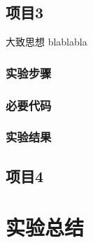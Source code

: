 \subsection{项目3}
大致思想 blablabla
\subsubsection{实验步骤}
\subsubsection{必要代码}
\subsubsection{实验结果}

\subsection{项目4}

\section{实验总结}


